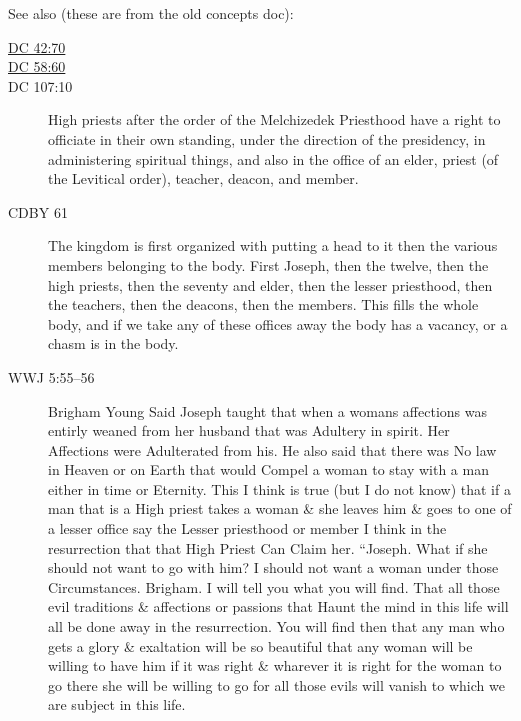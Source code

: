 		See also (these are from the old concepts doc):
		
		\begin{description}
		\item[{\hyperref[DC42-70]{DC 42:70}}]
		\item[{\hyperref[DC58-60]{DC 58:60}}]
		\item[DC 107:10] High priests after the order of the Melchizedek Priesthood have a right to officiate in their own standing, under the direction of the presidency, in administering spiritual things, and also in the office of an elder, priest (of the Levitical order), teacher, deacon, and member.
		\item[CDBY 61] The kingdom is first organized with putting a head to it then the various members belonging to the body. First Joseph, then the twelve, then the high priests, then the seventy and elder, then the lesser priesthood, then the teachers, then the deacons, then the members. This fills the whole body, and if we take any of these offices away the body has a vacancy, or a chasm is in the body.
		\item[WWJ 5:55--56] Brigham Young Said Joseph taught that when a womans affections was entirly weaned from her husband that was Adultery in spirit. Her Affections were Adulterated from his. He also said that there was No law in Heaven or on Earth that would Compel a woman to stay with a man either in time or Eternity. This I think is true (but I do not know) that if a man that is a High priest takes a woman \& she leaves him \& goes to one of a lesser office say the Lesser priesthood or member I think in the resurrection that that High Priest Can Claim her. ``Joseph. What if she should not want to go with him? I should not want a woman under those Circumstances. Brigham. I will tell you what you will find. That all those evil traditions \& affections or passions that Haunt the mind in this life will all be done away in the resurrection. You will find then that any man who gets a glory \& exaltation will be so beautiful that any woman will be willing to have him if it was right \& wharever it is right for the woman to go there she will be willing to go for all those evils will vanish to which we are subject in this life.
		\end{description}